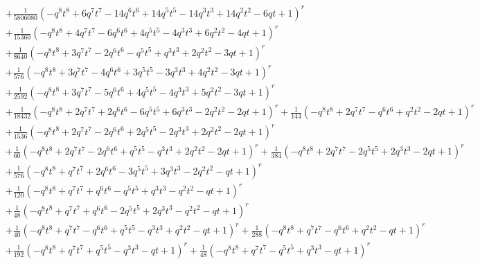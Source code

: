 \documentclass[11pt,english]{amsart}
\numberwithin{equation}{section}
\numberwithin{figure}{section}
\theoremstyle{plain}
\theoremstyle{plain}
\theoremstyle{definition}
\theoremstyle{remark}
\begin{document}
{\begin{align*}
& + \frac{1}{5806080}  {\left(-q^{8} t^{8} + 6  q^{7} t^{7} - 14  q^{6} t^{6} + 14  q^{5} t^{5} - 14  q^{3} t^{3} + 14  q^{2} t^{2} - 6  q t + 1\right)}^{r} \\
& + \frac{1}{15360}  {\left(-q^{8} t^{8} + 4  q^{7} t^{7} - 6  q^{6} t^{6} + 4  q^{5} t^{5} - 4  q^{3} t^{3} + 6  q^{2} t^{2} - 4  q t + 1\right)}^{r} \\
& + \frac{1}{8640}  {\left(-q^{8} t^{8} + 3  q^{7} t^{7} - 2  q^{6} t^{6} - q^{5} t^{5} + q^{3} t^{3} + 2  q^{2} t^{2} - 3  q t + 1\right)}^{r} \\
& + \frac{1}{576}  {\left(-q^{8} t^{8} + 3  q^{7} t^{7} - 4  q^{6} t^{6} + 3  q^{5} t^{5} - 3  q^{3} t^{3} + 4  q^{2} t^{2} - 3  q t + 1\right)}^{r} \\
& + \frac{1}{2592}  {\left(-q^{8} t^{8} + 3  q^{7} t^{7} - 5  q^{6} t^{6} + 4  q^{5} t^{5} - 4  q^{3} t^{3} + 5  q^{2} t^{2} - 3  q t + 1\right)}^{r} \\
& + \frac{1}{18432}  {\left(-q^{8} t^{8} + 2  q^{7} t^{7} + 2  q^{6} t^{6} - 6  q^{5} t^{5} + 6  q^{3} t^{3} - 2  q^{2} t^{2} - 2  q t + 1\right)}^{r} + \frac{1}{144}  {\left(-q^{8} t^{8} + 2  q^{7} t^{7} - q^{6} t^{6} + q^{2} t^{2} - 2  q t + 1\right)}^{r} \\
& + \frac{1}{1536}  {\left(-q^{8} t^{8} + 2  q^{7} t^{7} - 2  q^{6} t^{6} + 2  q^{5} t^{5} - 2  q^{3} t^{3} + 2  q^{2} t^{2} - 2  q t + 1\right)}^{r} \\
& + \frac{1}{60}  {\left(-q^{8} t^{8} + 2  q^{7} t^{7} - 2  q^{6} t^{6} + q^{5} t^{5} - q^{3} t^{3} + 2  q^{2} t^{2} - 2  q t + 1\right)}^{r} + \frac{1}{384}  {\left(-q^{8} t^{8} + 2  q^{7} t^{7} - 2  q^{5} t^{5} + 2  q^{3} t^{3} - 2  q t + 1\right)}^{r} \\
& + \frac{1}{576}  {\left(-q^{8} t^{8} + q^{7} t^{7} + 2  q^{6} t^{6} - 3  q^{5} t^{5} + 3  q^{3} t^{3} - 2  q^{2} t^{2} - q t + 1\right)}^{r} \\
& + \frac{1}{120}  {\left(-q^{8} t^{8} + q^{7} t^{7} + q^{6} t^{6} - q^{5} t^{5} + q^{3} t^{3} - q^{2} t^{2} - q t + 1\right)}^{r} \\
& + \frac{1}{48}  {\left(-q^{8} t^{8} + q^{7} t^{7} + q^{6} t^{6} - 2  q^{5} t^{5} + 2  q^{3} t^{3} - q^{2} t^{2} - q t + 1\right)}^{r} \\
& + \frac{1}{40}  {\left(-q^{8} t^{8} + q^{7} t^{7} - q^{6} t^{6} + q^{5} t^{5} - q^{3} t^{3} + q^{2} t^{2} - q t + 1\right)}^{r} + \frac{1}{288}  {\left(-q^{8} t^{8} + q^{7} t^{7} - q^{6} t^{6} + q^{2} t^{2} - q t + 1\right)}^{r} \\
& + \frac{1}{192}  {\left(-q^{8} t^{8} + q^{7} t^{7} + q^{5} t^{5} - q^{3} t^{3} - q t + 1\right)}^{r} + \frac{1}{48}  {\left(-q^{8} t^{8} + q^{7} t^{7} - q^{5} t^{5} + q^{3} t^{3} - q t + 1\right)}^{r} \\

\end{align*}}
\end{document}
